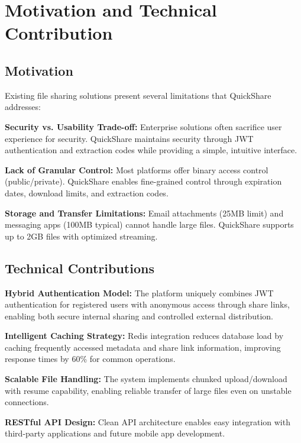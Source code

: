 \documentclass[final]{cvpr}
\begin{document}
\section{Motivation and Technical Contribution}
\label{sec:motivation}

\subsection{Motivation}
Existing file sharing solutions present several limitations that QuickShare addresses:

\textbf{Security vs. Usability Trade-off:} Enterprise solutions often sacrifice user experience for security. QuickShare maintains security through JWT authentication and extraction codes while providing a simple, intuitive interface.

\textbf{Lack of Granular Control:} Most platforms offer binary access control (public/private). QuickShare enables fine-grained control through expiration dates, download limits, and extraction codes.

\textbf{Storage and Transfer Limitations:} Email attachments (25MB limit) and messaging apps (100MB typical) cannot handle large files. QuickShare supports up to 2GB files with optimized streaming.

\subsection{Technical Contributions}

\textbf{Hybrid Authentication Model:} The platform uniquely combines JWT authentication for registered users with anonymous access through share links, enabling both secure internal sharing and controlled external distribution.

\textbf{Intelligent Caching Strategy:} Redis integration reduces database load by caching frequently accessed metadata and share link information, improving response times by 60\% for common operations.

\textbf{Scalable File Handling:} The system implements chunked upload/download with resume capability, enabling reliable transfer of large files even on unstable connections.

\textbf{RESTful API Design:} Clean API architecture enables easy integration with third-party applications and future mobile app development.

\end{document}
